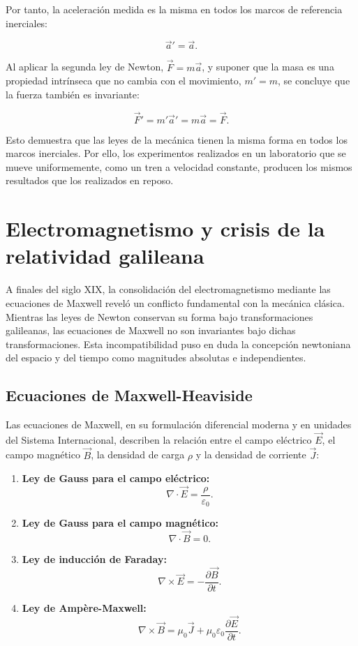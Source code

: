 Por tanto, la aceleración medida es la misma en todos los marcos de referencia inerciales:

\[
    \vec{a}'=\vec{a}.
\]

Al aplicar la segunda ley de Newton, $\vec{F}=m\vec{a}$, y suponer que la masa es una propiedad intrínseca que no cambia con el movimiento, $m'=m$, se concluye que la fuerza también es invariante:

\[
    \vec{F}'=m'\vec{a}'=m\vec{a}=\vec{F}.
\]

Esto demuestra que las leyes de la mecánica tienen la misma forma en todos los marcos inerciales. Por ello, los experimentos realizados en un laboratorio que se mueve uniformemente, como un tren a velocidad constante, producen los mismos resultados que los realizados en reposo.

\section{Electromagnetismo y crisis de la relatividad galileana}

A finales del siglo XIX, la consolidación del electromagnetismo mediante las ecuaciones de Maxwell reveló un conflicto fundamental con la mecánica clásica. Mientras las leyes de Newton conservan su forma bajo transformaciones galileanas, las ecuaciones de Maxwell no son invariantes bajo dichas transformaciones. Esta incompatibilidad puso en duda la concepción newtoniana del espacio y del tiempo como magnitudes absolutas e independientes.

\subsection{Ecuaciones de Maxwell-Heaviside}

Las ecuaciones de Maxwell, en su formulación diferencial moderna y en unidades del Sistema Internacional, describen la relación entre el campo eléctrico $\vec{E}$, el campo magnético $\vec{B}$, la densidad de carga $\rho$ y la densidad de corriente $\vec{J}$:

\begin{enumerate}
    \item \textbf{Ley de Gauss para el campo eléctrico:}
    \[
        \nabla\cdot\vec{E}=\frac{\rho}{\varepsilon_0}.
    \]

    \item \textbf{Ley de Gauss para el campo magnético:}
    \[
        \nabla\cdot\vec{B}=0.
    \]

    \item \textbf{Ley de inducción de Faraday:}
    \[
        \nabla\times\vec{E}=-\frac{\partial\vec{B}}{\partial t}.
    \]

    \item \textbf{Ley de Ampère-Maxwell:}
    \[
        \nabla\times\vec{B}
        =\mu_0\vec{J}
        +\mu_0\varepsilon_0\frac{\partial\vec{E}}{\partial t}.
    \]
\end{enumerate}

